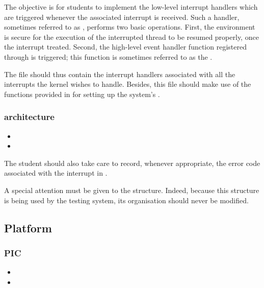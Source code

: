 The objective is for students to implement the low-level interrupt handlers
which are triggered whenever the associated interrupt is received. Such a
handler, sometimes referred to as , performs two basic
operations. First, the environment is secure for the execution of the
interrupted thread to be resumed properly, once the interrupt treated.
Second, the high-level event handler function registered through
 is triggered; this function is sometimes referred
to as the .

The file  should thus contain the interrupt handlers
associated with all the interrupts the kernel wishes to handle. Besides,
this file should make use of the functions provided in 
for setting up the system's .

\subsubsection*{architecture}

\begin{itemize}
  \item
  \item
\end{itemize}

The student should also take care to record, whenever appropriate, the
error code associated with the interrupt in .

A special attention must be given to the  structure.
Indeed, because this structure is being used by the testing system, its
organisation should never be modified.

\subsection{Platform}

\subsubsection*{PIC}

\begin{itemize}
  \item
  \item
\end{itemize}

